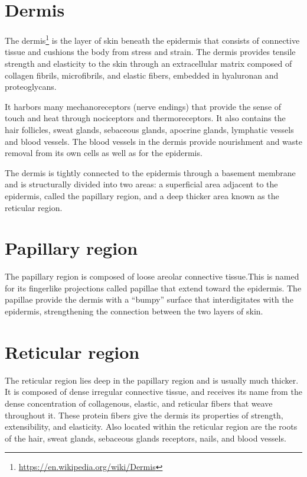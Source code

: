 \documentclass[]{book}
\let\rmarkdownfootnote\footnote%
\def\footnote{\protect\rmarkdownfootnote}
\renewcommand{\href}[2]{#2\footnote{\url{#1}}}
\theoremstyle{definition}
\theoremstyle{definition}
\theoremstyle{definition}
\theoremstyle{remark}
\begin{document}
\section{Dermis}\label{dermis}

The \href{https://en.wikipedia.org/wiki/Dermis}{dermis} is the layer of
skin beneath the epidermis that consists of connective tissue and
cushions the body from stress and strain. The dermis provides tensile
strength and elasticity to the skin through an extracellular matrix
composed of collagen fibrils, microfibrils, and elastic fibers, embedded
in hyaluronan and proteoglycans.

It harbors many mechanoreceptors (nerve endings) that provide the sense
of touch and heat through nociceptors and thermoreceptors. It also
contains the hair follicles, sweat glands, sebaceous glands, apocrine
glands, lymphatic vessels and blood vessels. The blood vessels in the
dermis provide nourishment and waste removal from its own cells as well
as for the epidermis.

The dermis is tightly connected to the epidermis through a basement
membrane and is structurally divided into two areas: a superficial area
adjacent to the epidermis, called the papillary region, and a deep
thicker area known as the reticular region.

\section{Papillary region}\label{papillary-region}

The papillary region is composed of loose areolar connective tissue.This
is named for its fingerlike projections called papillae that extend
toward the epidermis. The papillae provide the dermis with a ``bumpy''
surface that interdigitates with the epidermis, strengthening the
connection between the two layers of skin.

\section{Reticular region}\label{reticular-region}

The reticular region lies deep in the papillary region and is usually
much thicker. It is composed of dense irregular connective tissue, and
receives its name from the dense concentration of collagenous, elastic,
and reticular fibers that weave throughout it. These protein fibers give
the dermis its properties of strength, extensibility, and elasticity.
Also located within the reticular region are the roots of the hair,
sweat glands, sebaceous glands receptors, nails, and blood vessels.
\end{document}
